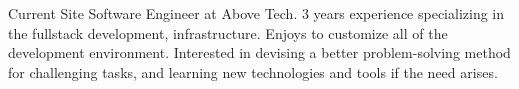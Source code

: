 

\begin{cvparagraph}

Current Site Software Engineer at Above Tech. 3 years experience specializing in the fullstack development, infrastructure. Enjoys to customize all of the development environment. Interested in devising a better problem-solving method for challenging tasks, and learning new technologies and tools if the need arises.
\end{cvparagraph}
